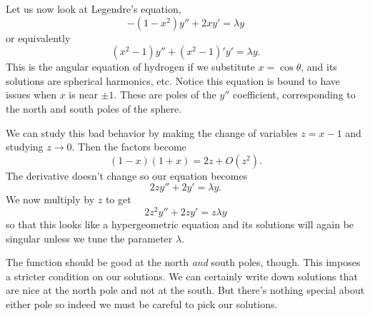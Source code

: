 \begin{exm}
    Let us now look at Legendre's equation,
    \begin{equation}
        -(1-x^2)y'' + 2xy' = \lambda y
    \end{equation}
    or equivalently
    \begin{equation}
        (x^2-1)y''+(x^2-1)' y' =\lambda y.
    \end{equation}
    This is the angular equation of hydrogen if we substitute $x=\cos\theta$, and its solutions are spherical harmonics, etc. Notice this equation is bound to have issues when $x$ is near $\pm 1$. These are poles of the $y''$ coefficient, corresponding to the north and south poles of the sphere.
    
    We can study this bad behavior by making the change of variables $z=x-1$ and studying $z\to 0$. Then the factors become
    \begin{equation}
        (1-x)(1+x) = 2z+O(z^2).
    \end{equation}
    The derivative doesn't change so our equation becomes 
    \begin{equation}
        2z y'' + 2 y' = \lambda y.
    \end{equation}
    We now multiply by $z$ to get
    \begin{equation}
        2z^2 y'' + 2z y' = z\lambda y
    \end{equation}
    so that this looks like a hypergeometric equation and its solutions will again be singular unless we tune the parameter $\lambda$.
    
    The function should be good at the north \emph{and} south poles, though. This imposes a stricter condition on our solutions. We can certainly write down solutions that are nice at the north pole and not at the south. But there's nothing special about either pole so indeed we must be careful to pick our solutions.
    

\end{exm}
